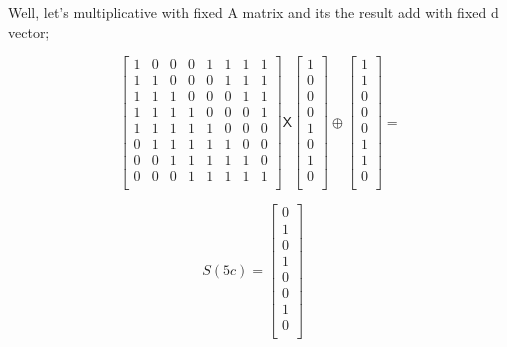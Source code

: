 \documentclass[11pt]{article}
\begin{document}
Well, let's multiplicative with fixed A matrix and its the result add with fixed d vector;\\


\begin{center}
  \[
\begin{bmatrix}
  1& 0& 0& 0& 1& 1& 1& 1\\
  1& 1& 0& 0& 0& 1& 1& 1\\
  1& 1& 1& 0& 0& 0& 1& 1\\
  1& 1& 1& 1& 0& 0& 0& 1\\
  1& 1& 1& 1& 1& 0& 0& 0\\
  0& 1& 1& 1& 1& 1& 0& 0\\
  0& 0& 1& 1& 1& 1& 1& 0\\
  0& 0& 0& 1& 1& 1& 1& 1\\ 
\end{bmatrix}
\mathsf{X}
\begin{bmatrix}
  1\\
  0\\
  0\\
  0\\
  1\\
  0\\
  1\\
  0\\  
\end{bmatrix} 
\oplus 
\begin{bmatrix}
  1\\
  1\\
  0\\
  0\\
  0\\
  1\\
  1\\
  0\\ 
\end{bmatrix}
=
\]
\end{center}


\begin{center}
  $$S(5c) = 
  \begin{bmatrix} 
   0\\
   1\\
   0\\
   1\\
   0\\
   0\\
   1\\
   0\\
  
  \end{bmatrix}
  \quad
  $$
\end{center}
\end{document}
